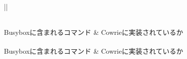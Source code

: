 \begin{longtable}{||}
  \caption{実装コマンド一覧}
  \label{table:command} \\
  \hline
  Busyboxに含まれるコマンド & Cowrieに実装されているか \\ \hline\hline
  \endfirsthead
   \\ \hline
  Busyboxに含まれるコマンド & Cowrieに実装されているか \\ \hline\hline
  \endhead
  \hline
   \\
  \endfoot
  \hline
   \\
  \endlastfoot


\end{longtable}
